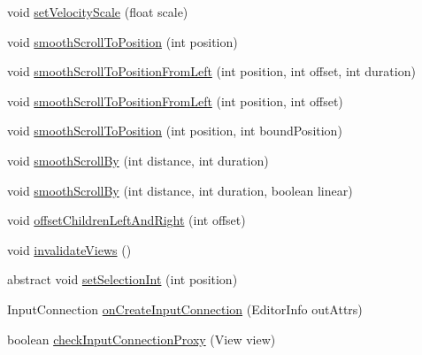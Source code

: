 \begin{DoxyCompactItemize}
void \hyperlink{classit_1_1sephiroth_1_1android_1_1library_1_1widget_1_1_abs_h_list_view_adb417fecc853fa88432af94033cdbf9e}{set\+Velocity\+Scale} (float scale)
\item 
void \hyperlink{classit_1_1sephiroth_1_1android_1_1library_1_1widget_1_1_abs_h_list_view_a19994602d889313ebf3f2e6665e1f6f7}{smooth\+Scroll\+To\+Position} (int position)
\item 
void \hyperlink{classit_1_1sephiroth_1_1android_1_1library_1_1widget_1_1_abs_h_list_view_a71e49f0acc7f78327e150bcbc0fea647}{smooth\+Scroll\+To\+Position\+From\+Left} (int position, int offset, int duration)
\item 
void \hyperlink{classit_1_1sephiroth_1_1android_1_1library_1_1widget_1_1_abs_h_list_view_aa8730d8a5ebf79184916979976b017fb}{smooth\+Scroll\+To\+Position\+From\+Left} (int position, int offset)
\item 
void \hyperlink{classit_1_1sephiroth_1_1android_1_1library_1_1widget_1_1_abs_h_list_view_a3e70521522669ed8edbcdec7d9269d70}{smooth\+Scroll\+To\+Position} (int position, int bound\+Position)
\item 
void \hyperlink{classit_1_1sephiroth_1_1android_1_1library_1_1widget_1_1_abs_h_list_view_a5089b81951e861287e2746f93134b1b9}{smooth\+Scroll\+By} (int distance, int duration)
\item 
void \hyperlink{classit_1_1sephiroth_1_1android_1_1library_1_1widget_1_1_abs_h_list_view_acbda16941a593e7c8fa9d0e448fe3a7e}{smooth\+Scroll\+By} (int distance, int duration, boolean linear)
\item 
void \hyperlink{classit_1_1sephiroth_1_1android_1_1library_1_1widget_1_1_abs_h_list_view_a6469278a8ed1a2ca62c20cf05613a88f}{offset\+Children\+Left\+And\+Right} (int offset)
\item 
void \hyperlink{classit_1_1sephiroth_1_1android_1_1library_1_1widget_1_1_abs_h_list_view_a4bd870ec81850713a2bab5858ef27e69}{invalidate\+Views} ()
\item 
abstract void \hyperlink{classit_1_1sephiroth_1_1android_1_1library_1_1widget_1_1_abs_h_list_view_abf34673d056f140b5fef14185f0a5cfb}{set\+Selection\+Int} (int position)
\item 
Input\+Connection \hyperlink{classit_1_1sephiroth_1_1android_1_1library_1_1widget_1_1_abs_h_list_view_ada828abd856b89b4db554e0add700167}{on\+Create\+Input\+Connection} (Editor\+Info out\+Attrs)
\item 
boolean \hyperlink{classit_1_1sephiroth_1_1android_1_1library_1_1widget_1_1_abs_h_list_view_a1df4b1f5d4477248af504fee51d9d8d2}{check\+Input\+Connection\+Proxy} (View view)

\end{DoxyCompactItemize}
